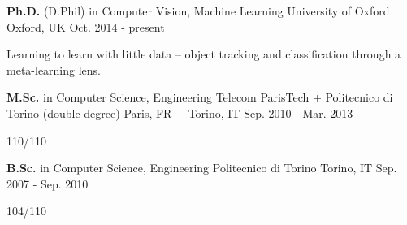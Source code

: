 

\begin{cventries}

  \cventry
    {\textbf{Ph.D.} (D.Phil) in Computer Vision, Machine Learning} %
    {University of Oxford} %
    {Oxford, UK} %
    {Oct. 2014 - present} %
    {
      \begin{cvitems} %
        \item {Learning to learn with little data -- object tracking and classification through a meta-learning lens.}
      \end{cvitems}
    }

  \cventry
    {\textbf{M.Sc.} in Computer Science, Engineering} %
    {Telecom ParisTech + Politecnico di Torino (double degree)} %
    {Paris, FR + Torino, IT} %
    {Sep. 2010 - Mar. 2013} %
    {
      \begin{cvitems} %
        \item {110/110}
      \end{cvitems}
    }

  \cventry
    {\textbf{B.Sc.} in Computer Science, Engineering} %
    {Politecnico di Torino} %
    {Torino, IT} %
    {Sep. 2007 - Sep. 2010} %
    {
      \begin{cvitems} %
        \item {104/110}
      \end{cvitems}
    }  
\end{cventries}
